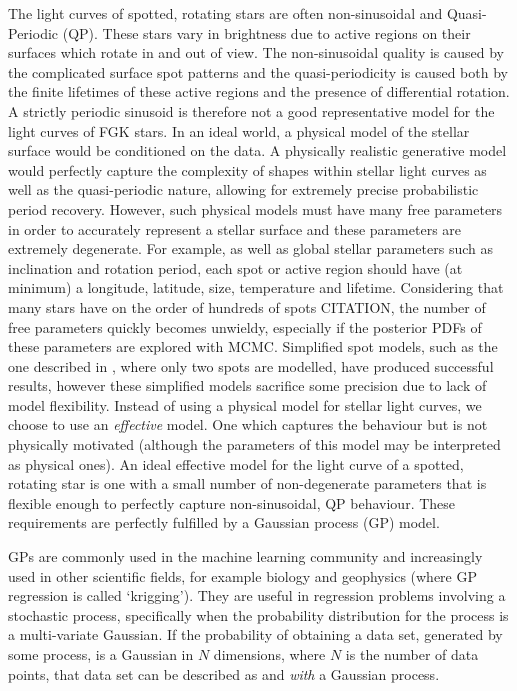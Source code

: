 
The light curves of spotted, rotating stars are often non-sinusoidal and
Quasi-Periodic (QP).
These stars vary in brightness due to active regions on their surfaces which
rotate in and out of view.
The non-sinusoidal quality is caused by the complicated surface spot patterns
and the quasi-periodicity is caused both by the finite lifetimes of these
active regions and the presence of differential rotation.
A strictly periodic sinusoid is therefore not a good representative
model for the light curves of FGK stars.
In an ideal world, a physical model of the stellar surface would be
conditioned on the data.
A physically realistic generative model would perfectly capture the
complexity of shapes within stellar light curves as well as the
quasi-periodic nature, allowing for extremely precise probabilistic period
recovery.
However, such physical models must have many free parameters in order to
accurately represent a stellar surface and these parameters are extremely
degenerate.
For example, as well as global stellar parameters such as inclination and
rotation period, each spot or active region should have (at minimum) a
longitude, latitude, size, temperature and lifetime.
Considering that many stars have on the order of hundreds of spots CITATION,
the number of free parameters quickly becomes unwieldy, especially if the
posterior PDFs of these parameters are explored with MCMC.
Simplified spot models, such as the one described in \citet{lanza}, where
only two spots are modelled, have produced successful results, however these
simplified models sacrifice some precision due to lack of model flexibility.
Instead of using a physical model for stellar light curves, we choose to use
an {\it effective} model.
One which captures the behaviour but is not physically motivated (although
the parameters of this model may be interpreted as physical ones).
An ideal effective model for the light curve of a spotted, rotating star is
one with a small number of non-degenerate parameters that is flexible enough
to perfectly capture non-sinusoidal, QP behaviour.
These requirements are perfectly fulfilled by a Gaussian process (GP) model.

GPs are commonly used in the machine learning community and increasingly used
in other scientific fields, for example biology and geophysics (where GP
regression is called `krigging').
They are useful in regression problems involving a stochastic process,
specifically when the probability distribution for the process is a
multi-variate Gaussian.
If the probability of obtaining a data set, generated by some process, is a
Gaussian in $N$ dimensions, where $N$ is the number of data points, that data
set can be described as and {\it with} a Gaussian process.

